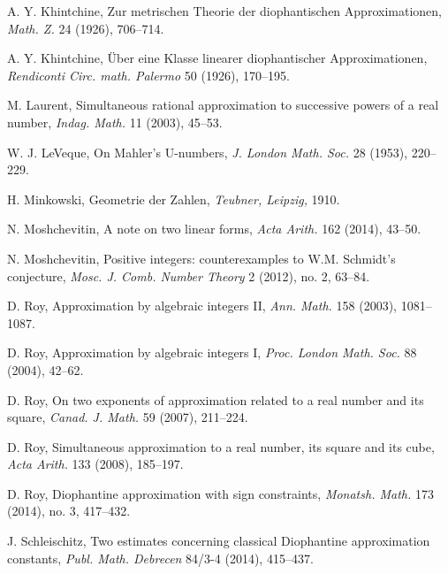 \documentclass[12pt]{amsart}
\theoremstyle{definition}
\begin{document}
\begin{thebibliography}{99}



 A. Y. Khintchine, Zur metrischen Theorie der diophantischen Approximationen,
{\em Math. Z.} 24 (1926), 706--714.

 A. Y. Khintchine, \"Uber eine Klasse linearer diophantischer Approximationen,
{\em Rendiconti Circ. math. Palermo} 50 (1926), 170--195.



 M. Laurent, Simultaneous rational approximation to successive powers
of a real number, {\em Indag. Math.} 11 (2003), 45--53. 

 W. J. LeVeque, On Mahler's U-numbers, {\em J. London Math. Soc.} 28 (1953), 220--229.

 H. Minkowski, Geometrie der Zahlen, {\em Teubner, Leipzig,} 1910.

 N. Moshchevitin, A note on two linear forms, {\em Acta Arith.} 162 (2014), 43--50.

 N. Moshchevitin, Positive integers: counterexamples to W.M. Schmidt's conjecture, 
{\em Mosc. J. Comb. Number Theory} 2 (2012), no. 2, 63--84.

 D. Roy, Approximation by algebraic integers II, {\em Ann. Math.} 158 (2003), 1081--1087.

 D. Roy, Approximation by algebraic integers I, {\em Proc. London Math. Soc.} 88 (2004), 42--62.



 D. Roy, On two exponents of approximation related to a real number and its square,
{\em Canad. J. Math.} 59 (2007), 211--224. 

 D. Roy,  Simultaneous approximation to a real number, its square and its cube, {\em Acta Arith.} 133 (2008), 185--197.

 D. Roy, Diophantine approximation with sign constraints, {\em Monatsh. Math.} 173 (2014), no. 3, 417--432.


 J. Schleischitz, Two estimates concerning classical Diophantine approximation constants,
{\em Publ. Math. Debrecen} 84/3-4 (2014), 415--437. 


\end{thebibliography}
\end{document}
